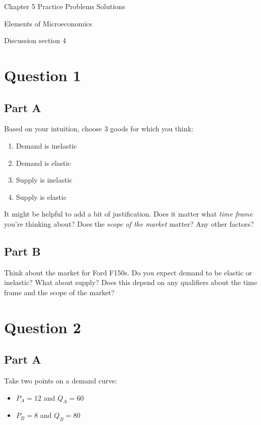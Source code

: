 \documentclass[12pt]{article}
\begin{document}
\begin{center}
\Large Chapter 5 Practice Problems Solutions

\medskip

\normalsize Elements of Microeconomics

\medskip

\small Discussion section 4
\end{center}

\medskip

\section*{Question 1}
\subsection*{Part A}
Based on your intuition, choose 3 goods for which you think:
\begin{enumerate}
    \item Demand is inelastic
    \item Demand is elastic
    \item Supply is inelastic
    \item Supply is elastic
\end{enumerate}
It might be helpful to add a bit of justification. Does it matter what \textit{time frame} you're thinking about? Does the \textit{scope of the market} matter? Any other factors?

\vspace{5mm}

\subsection*{Part B}
Think about the market for Ford F150s. Do you expect demand to be elastic or inelastic? What about supply? Does this depend on any qualifiers about the time frame and the scope of the market?

\vspace{5mm}

\section*{Question 2}
\subsection*{Part A}
Take two points on a demand curve:
\begin{itemize}
    \item $P_A=12$ and $Q_A=60$
    \item $P_B=8$ and $Q_B=80$
\end{itemize}
\end{document}
